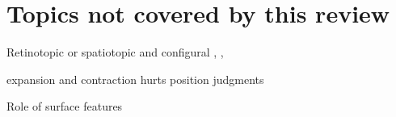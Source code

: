\documentclass[]{book}
\begin{document}
\hypertarget{topics-not-covered-by-this-review}{%
\section{Topics not covered by this review}\label{topics-not-covered-by-this-review}}

Retinotopic or spatiotopic and configural \citet{yantisMultielementVisualTracking1992}, \citet{billHierarchicalStructureEmployed2020}, \citet{howeCoordinateSystemsUsed2010}

expansion and contraction hurts position judgments \citet{howeVisuallyTrackingLocalizing2013}

Role of surface features \citet{papenmeierTrackingLocationFeatures2014}


\end{document}
